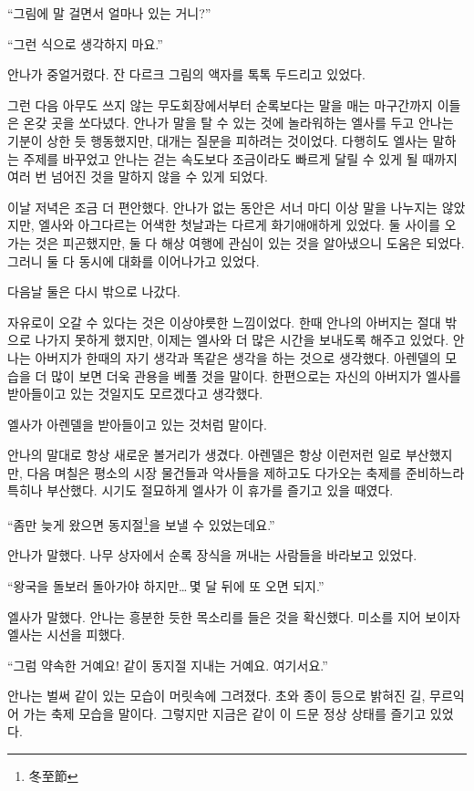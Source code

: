 ``그림에 말 걸면서 얼마나 있는 거니?''

``그런 식으로 생각하지 마요.''

안나가 중얼거렸다. 잔 다르크 그림의 액자를 톡톡 두드리고 있었다.

그런 다음 아무도 쓰지 않는 무도회장에서부터 순록보다는 말을 매는 마구간까지 이들은 온갖 곳을 쏘다녔다. 안나가 말을 탈 수 있는 것에 놀라워하는 엘사를 두고 안나는 기분이 상한 듯 행동했지만, 대개는 질문을 피하려는 것이었다. 다행히도 엘사는 말하는 주제를 바꾸었고 안나는 걷는 속도보다 조금이라도 빠르게 달릴 수 있게 될 때까지 여러 번 넘어진 것을 말하지 않을 수 있게 되었다.

이날 저녁은 조금 더 편안했다. 안나가 없는 동안은 서너 마디 이상 말을 나누지는 않았지만, 엘사와 아그다르는 어색한 첫날과는 다르게 화기애애하게 있었다. 둘 사이를 오가는 것은 피곤했지만, 둘 다 해상 여행에 관심이 있는 것을 알아냈으니 도움은 되었다. 그러니 둘 다 동시에 대화를 이어나가고 있었다.

다음날 둘은 다시 밖으로 나갔다.

자유로이 오갈 수 있다는 것은 이상야릇한 느낌이었다. 한때 안나의 아버지는 절대 밖으로 나가지 못하게 했지만, 이제는 엘사와 더 많은 시간을 보내도록 해주고 있었다. 안나는 아버지가 한때의 자기 생각과 똑같은 생각을 하는 것으로 생각했다. 아렌델의 모습을 더 많이 보면 더욱 관용을 베풀 것을 말이다. 한편으로는 자신의 아버지가 엘사를 받아들이고 있는 것일지도 모르겠다고 생각했다.

엘사가 아렌델을 받아들이고 있는 것처럼 말이다.

안나의 말대로 항상 새로운 볼거리가 생겼다. 아렌델은 항상 이런저런 일로 부산했지만, 다음 며칠은 평소의 시장 물건들과 악사들을 제하고도 다가오는 축제를 준비하느라 특히나 부산했다. 시기도 절묘하게 엘사가 이 휴가를 즐기고 있을 때였다.

``좀만 늦게 왔으면 동지절\footnote{冬至節}을 보낼 수 있었는데요.''

안나가 말했다. 나무 상자에서 순록 장식을 꺼내는 사람들을 바라보고 있었다.

``왕국을 돌보러 돌아가야 하지만\ldots\,몇 달 뒤에 또 오면 되지.''

엘사가 말했다. 안나는 흥분한 듯한 목소리를 들은 것을 확신했다. 미소를 지어 보이자 엘사는 시선을 피했다.

``그럼 약속한 거예요! 같이 동지절 지내는 거예요. 여기서요.''

안나는 벌써 같이 있는 모습이 머릿속에 그려졌다. 초와 종이 등으로 밝혀진 길, 무르익어 가는 축제 모습을 말이다. 그렇지만 지금은 같이 이 드문 정상 상태를 즐기고 있었다.

